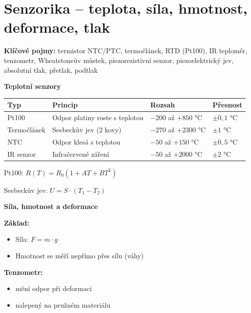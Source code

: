 \documentclass[a4paper,10pt]{article}
\begin{document}
\section{Senzorika -- teplota, síla, hmotnost, deformace, tlak}

\begin{pojmybox}
\textbf{Klíčové pojmy:}
termistor NTC/PTC, termočlánek, RTD (Pt100),
IR teploměr, tenzometr, Wheatstoneův můstek,
piezorezistivní senzor, piezoelektrický jev,
absolutní tlak, přetlak, podtlak
\end{pojmybox}

\begin{vysvetlenibox}

\textbf{Teplotní senzory}

\begin{center}
\begin{tabularx}{0.95\linewidth}{l X l l}
Typ & Princip & Rozsah & Přesnost \\
\hline
Pt100 & Odpor platiny roste s teplotou & $-200$ až $+850$ °C & $\pm0{,}1$ °C \\
Termočlánek & Seebeckův jev (2 kovy) & $-270$ až $+2300$ °C & $\pm1$ °C \\
NTC & Odpor klesá s teplotou & $-50$ až $+150$ °C & $\pm0{,}5$ °C \\
IR senzor & Infračervené záření & $-50$ až $+2000$ °C & $\pm2$ °C \\
\end{tabularx}
\end{center}

\begin{vzorcebox}
Pt100: $R(T) = R_0 (1 + AT + BT^2)$

Seebeckův jev: $U = S \cdot (T_1 - T_2)$
\end{vzorcebox}

\textbf{Síla, hmotnost a deformace}

\textbf{Základ:}
\begin{itemize}
\item Síla: $F = m \cdot g$
\item Hmotnost se měří nepřímo přes sílu (váhy)
\end{itemize}

\textbf{Tenzometr:}
\begin{itemize}
\item mění odpor při deformaci
\item nalepený na pružném materiálu
\end{itemize}


\end{vysvetlenibox}
\end{document}
